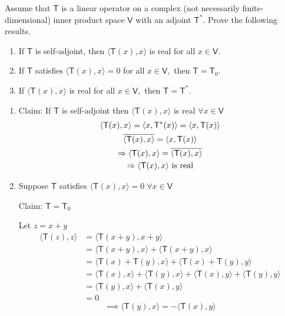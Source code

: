 Assume that $\mathsf{T}$ is a linear operator on a complex (not
necessarily finite-dimensional) inner product space $\mathsf{V}$ with
an adjoint $\mathsf{T}^*.$ Prove the following results.
\begin{enumerate}
\item If $\mathsf{T}$ is self-adjoint, then $\langle
  \mathsf{T}(x),x\rangle$ is real for all $x \in \mathsf{V}.$
\item If $\mathsf{T}$ satisfies $\langle \mathsf{T}(x),x \rangle = 0$
  for all $x \in \mathsf{V},$ then $\mathsf{T} = \mathsf{T}_0.$\\
\item If $\langle \mathsf{T}(x),x \rangle$ is real for all $x \in
  \mathsf{V},$ then $\mathsf{T} = \mathsf{T}^*.$
\end{enumerate}
\begin{enumerate}
\item Claim: If $\mathsf{T}$ is self-adjoint then $\langle
  \mathsf{T}(x),x \rangle$ is real $\forall x \in \mathsf{V}$
\begin{gather}
\langle \mathsf{T}(x),x \rangle = \langle x, \mathsf{T}^*(x) \rangle =
\langle x, \mathsf{T}(x) \rangle\\
\overline{\langle \mathsf{T}(x),x \rangle} = \langle x, \mathsf{T}(x)
\rangle\\
\implies \langle \mathsf{T}(x),x \rangle = \overline{\langle
  \mathsf{T}(x),x \rangle}\\
\notag \implies \langle\mathsf{T}(x), x \rangle \text{ is real}
\end{gather}
\item Suppose $\mathsf{T}$ satisfies $\langle \mathsf{T}(x),x \rangle =0 \;
\forall x \in \mathsf{V}$ 

Claim: $\mathsf{T} = \mathsf{T}_0$

Let $z = x + y$
\begin{align}
\langle \mathsf{T}(z),z\rangle &= \langle \mathsf{T}(x+y),x+y\rangle
\\
&= \langle \mathsf{T}(x+y),x\rangle + \langle
\mathsf{T}(x+y),x\rangle\\
&= \langle\mathsf{T}(x)+\mathsf{T}(y),x\rangle + \langle
\mathsf{T}(x)+\mathsf{T}(y),y\rangle \\
&= \langle \mathsf{T}(x),x \rangle + \langle \mathsf{T}(y),x \rangle +
\langle \mathsf{T}(x),y\rangle + \langle \mathsf{T}(y),y\rangle\\
&= \langle \mathsf{T}(y),x \rangle + \langle \mathsf{T}(x),y\rangle \\
&= 0
\end{align}
\begin{equation}
\implies \langle \mathsf{T}(y),x \rangle =  -\langle \mathsf{T}(x),y\rangle
\end{equation}


\end{enumerate}
